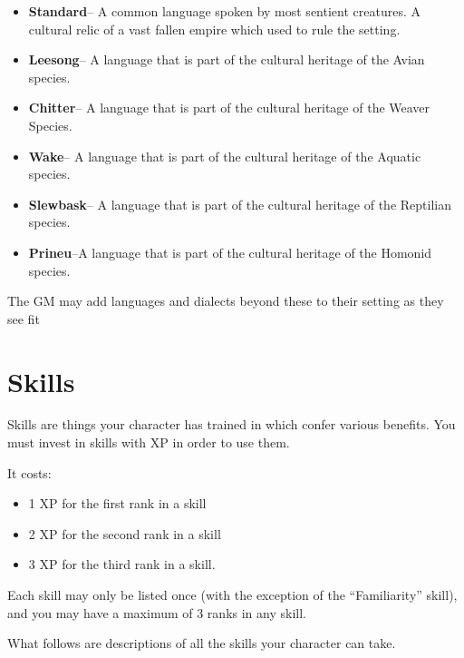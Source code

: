 \begin{GRPquicknotewide}
\begin{itemize}
	\item \textbf{Standard}-- A common language spoken by most sentient creatures. A cultural relic of a vast fallen empire which used to rule the setting.
	\item \textbf{Leesong}-- A language that is part of the cultural heritage of the Avian species.
	\item \textbf{Chitter}-- A language that is part of the cultural heritage of the Weaver Species.
	\item \textbf{Wake}-- A language that is part of the cultural heritage of the Aquatic species.
	\item \textbf{Slewbask}-- A language that is part of the cultural heritage of the Reptilian species.
	\item \textbf{Prineu}--A language that is part of the cultural heritage of the Homonid species.
\end{itemize}
\end{GRPquicknotewide}

The GM may add languages and dialects beyond these to their setting as they see fit

\section{Skills}\label{sec:skills}

Skills are things your character has trained in which confer various benefits. You must invest in skills with XP in order to use them. 

\noindent It costs:
\begin{itemize}
	\item 1 XP for the first rank in a skill
	\item 2 XP for the second rank in a skill
	\item 3 XP for the third rank in a skill.
\end{itemize}

Each skill may only be listed once (with the exception of the ``Familiarity'' skill), and you may have a maximum of 3 ranks in any skill.

What follows are descriptions of all the skills your character can take.


